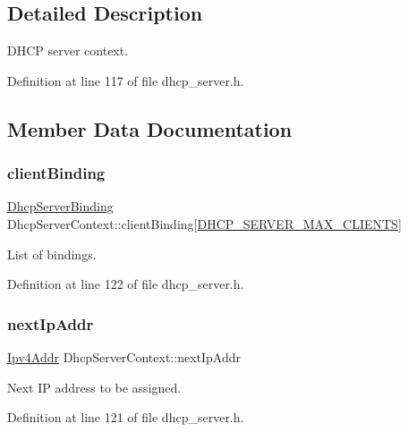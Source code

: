\subsection{Detailed Description}
D\+H\+CP server context. 

Definition at line 117 of file dhcp\+\_\+server.\+h.



\subsection{Member Data Documentation}
\mbox{\label{structDhcpServerContext_a15ab325de708c7913708082f2e04bb75}} 
\subsubsection{\texorpdfstring{client\+Binding}{clientBinding}}
{\footnotesize\ttfamily \hyperlink{structDhcpServerBinding}{Dhcp\+Server\+Binding} Dhcp\+Server\+Context\+::client\+Binding\mbox{[}\hyperlink{dhcp__server_8h_aedfad8c8acee15994969b8ebd1bc0333}{D\+H\+C\+P\+\_\+\+S\+E\+R\+V\+E\+R\+\_\+\+M\+A\+X\+\_\+\+C\+L\+I\+E\+N\+TS}\mbox{]}}



List of bindings. 



Definition at line 122 of file dhcp\+\_\+server.\+h.

\mbox{\label{structDhcpServerContext_aa6df6d5693549dcf2d1cd6570e7a3389}} 
\subsubsection{\texorpdfstring{next\+Ip\+Addr}{nextIpAddr}}
{\footnotesize\ttfamily \hyperlink{ipv4_8h_a411debb3d770caa0c06d3f73367da37f}{Ipv4\+Addr} Dhcp\+Server\+Context\+::next\+Ip\+Addr}



Next IP address to be assigned. 



Definition at line 121 of file dhcp\+\_\+server.\+h.

